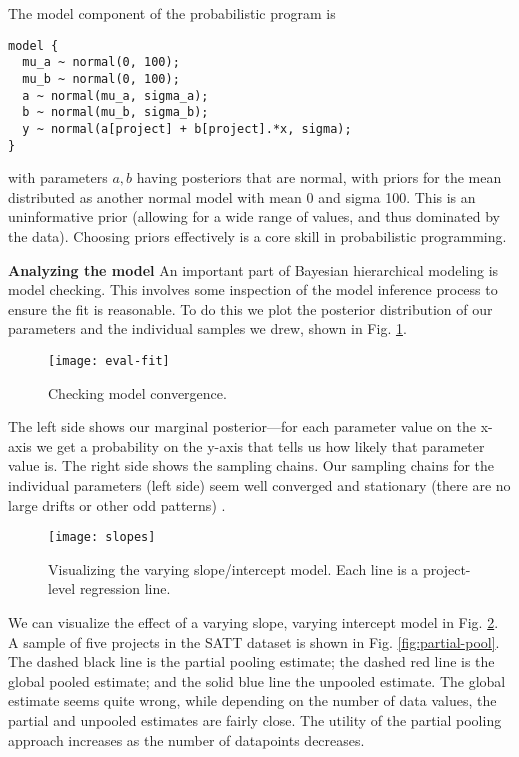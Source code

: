 \documentclass[sigconf,natbib=false]{acmart}
\begin{document}
The model component of the probabilistic program is 
\begin{verbatim}
model {
  mu_a ~ normal(0, 100);
  mu_b ~ normal(0, 100);
  a ~ normal(mu_a, sigma_a);
  b ~ normal(mu_b, sigma_b);
  y ~ normal(a[project] + b[project].*x, sigma);
}
\end{verbatim}

with parameters $a,b$ having posteriors that are normal, with priors for the mean distributed as another normal model with mean 0 and sigma 100. This is an uninformative prior (allowing for a wide range of values, and thus dominated by the data). Choosing priors effectively is a core skill in probabilistic programming. 

\textbf{Analyzing the model} An important part of Bayesian hierarchical modeling is model checking. This involves some inspection of the model inference process to ensure the fit is reasonable. To do this we plot the posterior distribution of our parameters and the individual samples we drew, shown in Fig. \ref{fig:modelcheck}.

\begin{figure}[tb]
	\centering
	\texttt{[image: eval-fit]}
	\caption{Checking model convergence.}
	\label{fig:modelcheck}
\end{figure}

The left side shows our marginal posterior---for each parameter value on the x-axis we get a probability on the y-axis that tells us how likely that parameter value is. The right side shows the sampling chains. Our sampling chains for the individual parameters (left side) seem well converged and stationary (there are no large drifts or other odd patterns) \cite{Sorensen16}.

\begin{figure}[tb]
	\centering
	\texttt{[image: slopes]}
	\caption{Visualizing the varying slope/intercept model. Each line is a project-level regression line.}
	\label{fig:slopes}
\end{figure}

We can visualize the effect of a varying slope, varying intercept model in Fig. \ref{fig:slopes}. A sample of five projects in the SATT dataset is shown in Fig. \ref{fig:partial-pool}. The dashed black line is the partial pooling estimate; the dashed red line is the global pooled estimate; and the solid blue line the unpooled estimate. The global estimate seems quite wrong, while depending on the number of data values, the partial and unpooled estimates are fairly close. The utility of the partial pooling approach increases as the number of datapoints decreases.
\end{document}
